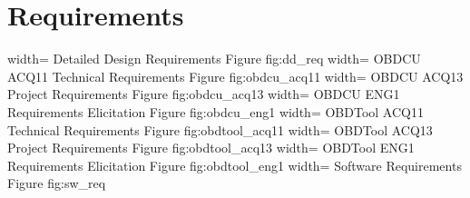 \chapter{Requirements}
\label{sec:Appendix}
 {width=\textwidth}%
 {Detailed Design Requirements}%
 {Figure}%
 {fig:dd_req}%
 {width=\textwidth}%
 {OBDCU ACQ11 Technical Requirements}%
 {Figure}%
 {fig:obdcu_acq11}%
 {width=\textwidth}%
 {OBDCU ACQ13 Project Requirements}%
 {Figure}%
 {fig:obdcu_acq13}%
 {width=\textwidth}%
 {OBDCU ENG1 Requirements Elicitation}%
 {Figure}%
 {fig:obdcu_eng1}%
 {width=\textwidth}%
 {OBDTool ACQ11 Technical Requirements}%
 {Figure}%
 {fig:obdtool_acq11}%
 {width=\textwidth}%
 {OBDTool ACQ13 Project Requirements}%
 {Figure}%
 {fig:obdtool_acq13}%
 {width=\textwidth}%
 {OBDTool ENG1 Requirements Elicitation}%
 {Figure}%
 {fig:obdtool_eng1}%
 {width=\textwidth}%
 {Software Requirements}%
 {Figure}%
 {fig:sw_req}%